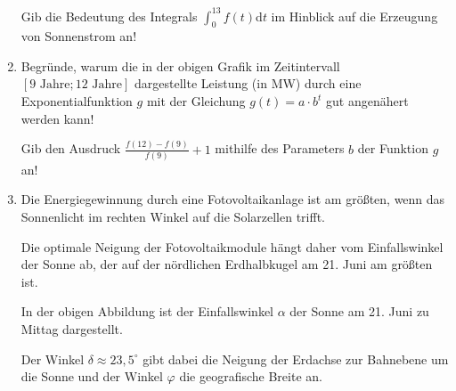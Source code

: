 \begin{langesbeispiel}
\begin{enumerate}
	Gib die Bedeutung des Integrals $\int^{13}_0{f(t)}$d$t$ im Hinblick auf die Erzeugung von Sonnenstrom an!
	
\item Begründe, warum die in der obigen Grafik im Zeitintervall $[9\text{ Jahre};12\text{ Jahre}]$ dargestellte Leistung (in MW) durch eine Exponentialfunktion $g$ mit der Gleichung $g(t)=a\cdot b^t$ gut angenähert werden kann!
	
	Gib den Ausdruck $\frac{f(12)-f(9)}{f(9)}+1$ mithilfe des Parameters $b$ der Funktion $g$ an!

\item Die Energiegewinnung durch eine Fotovoltaikanlage ist am größten, wenn das Sonnenlicht im rechten Winkel auf die Solarzellen trifft. 

Die optimale Neigung der Fotovoltaikmodule hängt daher vom Einfallswinkel der Sonne ab, der auf der nördlichen Erdhalbkugel am 21. Juni am größten ist.
\begin{center}
\end{center}

In der obigen Abbildung ist der Einfallswinkel $\alpha$ der Sonne am 21. Juni zu Mittag dargestellt. 

Der Winkel $\delta\approx 23,5^\circ$ gibt dabei die Neigung der Erdachse zur Bahnebene um die Sonne und der Winkel $\varphi$ die geografische Breite an.


\end{enumerate}
\end{langesbeispiel}
